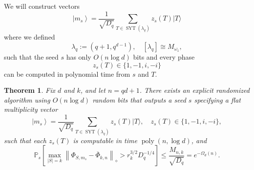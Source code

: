 \documentclass[11pt,letterpaper]{article}
\newcounter{alg}
\theoremstyle{plain}
\theoremstyle{plain}
\theoremstyle{plain}
\theoremstyle{plain}
\theoremstyle{plain}
\theoremstyle{plain}
\theoremstyle{plain}
\newtheorem{smtheorem}{Theorem}[section]
\theoremstyle{definition}
\theoremstyle{plain}
\begin{document}
We will construct vectors
\begin{equation}\label{eq:family_of_multiplicity_vecs}
    \left|m_s\right\rangle=\frac{1}{\sqrt{D_q}} \sum_{T \in \operatorname{SYT}\left(\lambda_q\right)} z_s(T)|T\rangle
\end{equation}
where we defined
\[
    \lambda_q:=(q+1,q^{d-1}), \quad [\lambda_q]\cong M_{\omega_1},
\]
such that the seed $s$ has only $O(n \log d)$ bits and every phase
\[
z_s(T) \in\{1,-1, i,-i\}
\]
can be computed in polynomial time from $s$ and $T$.

\begin{smtheorem}\label{thrm:randomized_multiplicity_vector}
    Fix $d$ and $k$, and let $n=q d+1$. There exists an explicit randomized algorithm using $O(n \log d)$ random bits that outputs a seed $s$ specifying a flat multiplicity vector
    $$
    \left|m_s\right\rangle=\frac{1}{\sqrt{D_q}} \sum_{T \in \operatorname{SYT}\left(\lambda_q\right)} z_s(T)|T\rangle, \quad z_s(T) \in\{1,-1, i,-i\},
    $$
    such that each $z_s(T)$ is computable in time $\operatorname{poly}(n, \log d)$, and
    \begin{equation}\label{eq:randomized_multiplicity_vector_bound}
    \mathbb{P}_s\left[\max _{|S|=k}\left\|\Phi_{S, m_s}-\overline{\Phi}_{k,n}\right\|_{\diamond}>r_k^{3 / 2} D_q^{-1 / 4}\right] \leq \frac{M_{n, k}}{\sqrt{D_q}}=e^{-\Omega_d(n)}.
    \end{equation}
\end{smtheorem}
\end{document}
